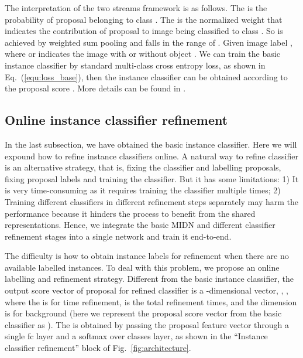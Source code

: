\documentclass[10pt,twocolumn,letterpaper]{article}
\begin{document}
The interpretation of the two streams framework is as follows.
The  is the probability of proposal  belonging to class .
The  is the normalized weight that indicates the contribution of proposal  to image being classified to class .
So  is achieved by weighted sum pooling and falls in the range of .
Given image label , where  or  indicates the image with or without object .
We can train the basic instance classifier by standard multi-class cross entropy loss, as shown in Eq.~(\ref{equ:loss_base}), then the instance classifier can be obtained according to the proposal score .
More details can be found in \cite{Ref:Bilen2016}.




\subsection{Online instance classifier refinement}
\label{sec:oicr}

In the last subsection, we have obtained the basic instance classifier.
Here we will expound how to refine instance classifiers online.
A natural way to refine classifier is an alternative strategy, that is, fixing the classifier and labelling proposals, fixing proposal labels and training the classifier.
But it has some limitations:
1) It is very time-consuming as it requires training the classifier multiple times;
2) Training different classifiers in different refinement steps separately may harm the performance because it hinders the process to benefit from the shared representations.
Hence, we integrate the basic MIDN and different classifier refinement stages into a single network and train it end-to-end.

The difficulty is how to obtain instance labels for refinement when there are no available labelled instances.
To deal with this problem, we propose an online labelling and refinement strategy.
Different from the basic instance classifier, the output score vector  of proposal  for refined classifier is a -dimensional vector, \ie, , where the  is for  time refinement,  is the total refinement times, and the  dimension is for background (here we represent the proposal score vector from the basic classifier as ).
The  is obtained by passing the proposal feature vector through a single fc layer and a softmax over classes layer, as shown in the ``Instance classifier refinement'' block of Fig.~\ref{fig:architecture}.
\end{document}
